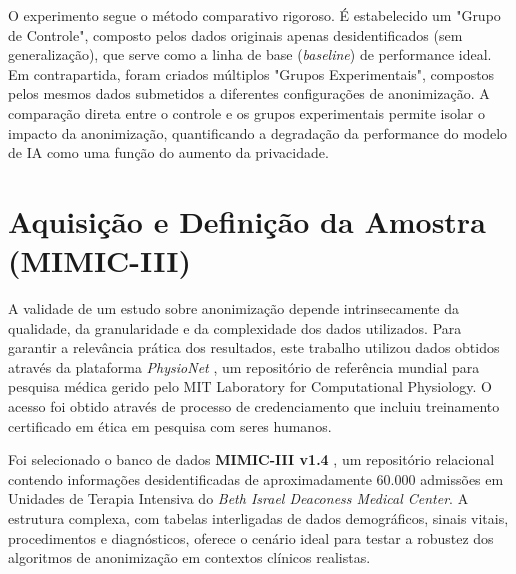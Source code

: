 O experimento segue o método comparativo rigoroso. É estabelecido um "Grupo de Controle", composto pelos dados originais apenas desidentificados (sem generalização), que serve como a linha de base (\textit{baseline}) de performance ideal. Em contrapartida, foram criados múltiplos "Grupos Experimentais", compostos pelos mesmos dados submetidos a diferentes configurações de anonimização. A comparação direta entre o controle e os grupos experimentais permite isolar o impacto da anonimização, quantificando a degradação da performance do modelo de IA como uma função do aumento da privacidade.

\section{Aquisição e Definição da Amostra (MIMIC-III)}
\label{sec:metod-aquisicao}

A validade de um estudo sobre anonimização depende intrinsecamente da qualidade, da granularidade e da complexidade dos dados utilizados. Para garantir a relevância prática dos resultados, este trabalho utilizou dados obtidos através da plataforma \textit{PhysioNet} \cite{Goldberger2000}, um repositório de referência mundial para pesquisa médica gerido pelo MIT Laboratory for Computational Physiology. O acesso foi obtido através de processo de credenciamento que incluiu treinamento certificado em ética em pesquisa com seres humanos.

Foi selecionado o banco de dados \textbf{MIMIC-III v1.4} \cite{Johnson2016}, um repositório relacional contendo informações desidentificadas de aproximadamente 60.000 admissões em Unidades de Terapia Intensiva do \textit{Beth Israel Deaconess Medical Center}. A estrutura complexa, com tabelas interligadas de dados demográficos, sinais vitais, procedimentos e diagnósticos, oferece o cenário ideal para testar a robustez dos algoritmos de anonimização em contextos clínicos realistas.


